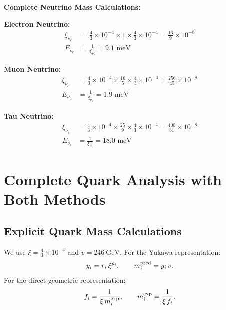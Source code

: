 	\textbf{Complete Neutrino Mass Calculations:}
	
	\textbf{Electron Neutrino:}
	\begin{align}
		\xi_{\nu_e} &= \frac{4}{3} \times 10^{-4} \times 1 \times \frac{4}{3} \times 10^{-4} = \frac{16}{9} \times 10^{-8} \\
		E_{\nu_e} &= \frac{1}{\xi_{\nu_e}} = 9.1 \text{ meV}
	\end{align}
	
	\textbf{Muon Neutrino:}
	\begin{align}
		\xi_{\nu_\mu} &= \frac{4}{3} \times 10^{-4} \times \frac{16}{5} \times \frac{4}{3} \times 10^{-4} = \frac{256}{45} \times 10^{-8} \\
		E_{\nu_\mu} &= \frac{1}{\xi_{\nu_\mu}} = 1.9 \text{ meV}
	\end{align}
	
	\textbf{Tau Neutrino:}
	\begin{align}
		\xi_{\nu_\tau} &= \frac{4}{3} \times 10^{-4} \times \frac{25}{9} \times \frac{4}{3} \times 10^{-4} = \frac{400}{81} \times 10^{-8} \\
		E_{\nu_\tau} &= \frac{1}{\xi_{\nu_\tau}} = 18.0 \text{ meV}
	\end{align}
	
	\section{Complete Quark Analysis with Both Methods}
	\label{sec:quark_analysis}
	
	\subsection{Explicit Quark Mass Calculations}
	\label{subsec:quark_calculations}
	
	We use $\xi=\tfrac{4}{3}\times10^{-4}$ and $v=246\ \mathrm{GeV}$.
	For the Yukawa representation:
	\[
	y_i = r_i\,\xi^{p_i},\qquad m_i^{\rm pred}=y_i\,v.
	\]
	For the direct geometric representation:
	\[
	f_i=\frac{1}{\xi\, m_i^{\rm exp}},\qquad m_i^{\rm exp}=\frac{1}{\xi\, f_i}.
	\]
	
